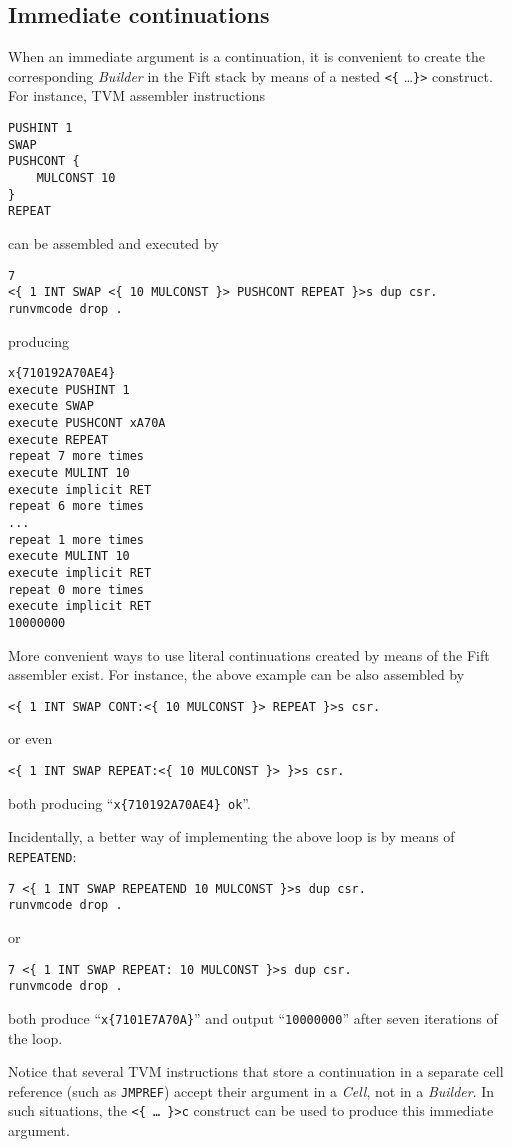 \documentclass[12pt,oneside]{article}
\def\mysubsection#1{\subsection{#1}\fancyhead[C]{\small{\textsc{\textrm{\thesubsection.} #1}}}}
\begin{document}
\mysubsection{Immediate continuations}\label{p:imm.cont}
When an immediate argument is a continuation, it is convenient to create the corresponding {\em Builder\/} in the Fift stack by means of a nested {\tt <\{} \dots {\tt \}>} construct. For instance, TVM assembler instructions
\begin{verbatim}
PUSHINT 1
SWAP
PUSHCONT {
    MULCONST 10
}
REPEAT
\end{verbatim}
can be assembled and executed by
\begin{verbatim}
7
<{ 1 INT SWAP <{ 10 MULCONST }> PUSHCONT REPEAT }>s dup csr.
runvmcode drop .
\end{verbatim}
producing
\begin{verbatim}
x{710192A70AE4}
execute PUSHINT 1
execute SWAP
execute PUSHCONT xA70A
execute REPEAT
repeat 7 more times
execute MULINT 10
execute implicit RET
repeat 6 more times
...
repeat 1 more times
execute MULINT 10
execute implicit RET
repeat 0 more times
execute implicit RET
10000000
\end{verbatim}

More convenient ways to use literal continuations created by means of the Fift assembler exist. For instance, the above example can be also assembled by
\begin{verbatim}
<{ 1 INT SWAP CONT:<{ 10 MULCONST }> REPEAT }>s csr.
\end{verbatim}
or even
\begin{verbatim}
<{ 1 INT SWAP REPEAT:<{ 10 MULCONST }> }>s csr.
\end{verbatim}
both producing ``{\tt x\{710192A70AE4\} ok}''.

Incidentally, a better way of implementing the above loop is by means of {\tt REPEATEND}:
\begin{verbatim}
7 <{ 1 INT SWAP REPEATEND 10 MULCONST }>s dup csr.
runvmcode drop .
\end{verbatim}
or
\begin{verbatim}
7 <{ 1 INT SWAP REPEAT: 10 MULCONST }>s dup csr.
runvmcode drop .
\end{verbatim}
both produce ``{\tt x\{7101E7A70A\}}'' and output ``{\tt 10000000}'' after seven iterations of the loop.

Notice that several TVM instructions that store a continuation in a separate cell reference (such as {\tt JMPREF}) accept their argument in a {\em Cell}, not in a {\em Builder}. In such situations, the {\tt <\{ \dots\ \}>c} construct can be used to produce this immediate argument.
\end{document}
